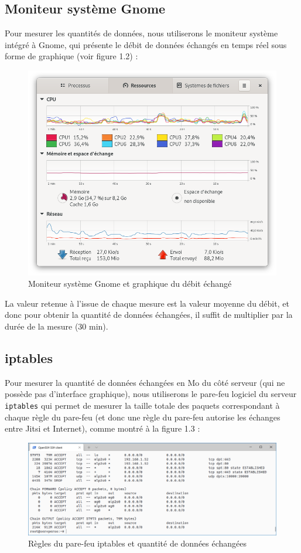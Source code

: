\documentclass[11pt,a4paper]{report}
\begin{document}
\subsection{Moniteur système Gnome}
Pour mesurer les quantités de données, nous utiliserons le moniteur système intégré à Gnome, qui présente le débit de données échangés en temps réel sous forme de graphique (voir figure 1.2) :

\begin{figure}[!h]
    \centering
    \includegraphics[scale=0.3]{capture_moniteur_sys.png}
    \caption{Moniteur système Gnome et graphique du débit échangé}
\end{figure}

La valeur retenue à l'issue de chaque mesure est la valeur moyenne du débit, et donc pour obtenir la quantité de données échangées, il suffit de multiplier par la durée de la mesure (30 min).

\subsection{iptables}
Pour mesurer la quantité de données échangées en Mo du côté serveur (qui ne possède pas d'interface graphique), nous utiliserons le pare-feu logiciel du serveur \texttt{iptables} qui permet de mesurer la taille totale des paquets correspondant à chaque règle du pare-feu (et donc une règle du pare-feu autorise les échanges entre Jitsi et Internet), comme montré à la figure 1.3 :
\begin{figure}[!h]
    \centering
    \includegraphics[scale=0.5]{iptables.PNG}
    \caption{Règles du pare-feu iptables et quantité de données échangées}
    \label{fig:my_label}
\end{figure}
\end{document}
